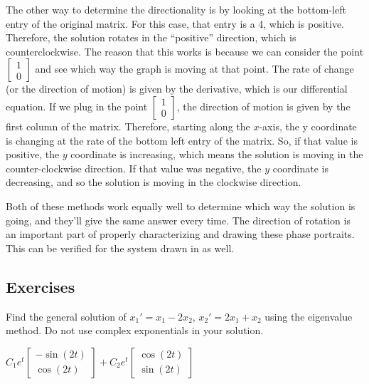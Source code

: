 The other way to determine the directionality is by looking at the bottom-left entry of the original matrix. For this case, that entry is a 4, which is positive. Therefore, the solution rotates in the ``positive'' direction, which is counterclockwise. The reason that this works is because we can consider the point $\left[\begin{smallmatrix} 1 \\ 0 \end{smallmatrix}\right]$ and see which way the graph is moving at that point. The rate of change (or the direction of motion) is given by the derivative, which is our differential equation. If we plug in the point $\left[\begin{smallmatrix} 1 \\ 0 \end{smallmatrix}\right]$, the direction of motion is given by the first column of the matrix. Therefore, starting along the $x$-axis, the y coordinate is changing at the rate of the bottom left entry of the matrix. So, if that value is positive, the $y$ coordinate is increasing, which means the solution is moving in the counter-clockwise direction. If that value was negative, the $y$ coordinate is decreasing, and so the solution is moving in the clockwise direction. 

Both of these methods work equally well to determine which way the solution is going, and they'll give the same answer every time. The direction of rotation is an important part of properly characterizing and drawing these phase portraits. This can be verified for the system drawn in  as well. 


\subsection{Exercises}


\begin{exercise}
Find the general solution of $x_1' = x_1 -2 x_2$,
$x_2' = 2 x_1 + x_2$ using the eigenvalue method.
Do not use complex exponentials in your solution.
\end{exercise}
\comboSol{%
}
{%
$C_1e^t\left[\begin{smallmatrix} -\sin(2t)\\ \cos(2t) \end{smallmatrix}\right] + C_2e^{t}\left[\begin{smallmatrix} \cos(2t) \\ \sin(2t) \end{smallmatrix}\right]$ \hfill{}\hfill\hfill
}

